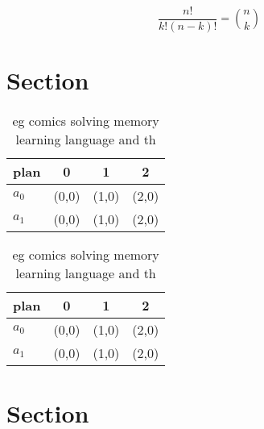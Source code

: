 \documentclass[a4paper]{article}
\begin{document}
\[ \frac{n!}{k!(n-k)!} = \binom{n}{k} \]

\section{Section}

\begin{table}
\begin{adjustbox}{width=0.6\columnwidth}
\begin{tabular}{|l|l|l|l|}
\hline
\textbf{plan} & \multicolumn{1}{c|}{\textbf{0}} & \multicolumn{1}{c|}{\textbf{1}} & \multicolumn{1}{c|}{\textbf{2}} \\ \hline
\textbf{$a_0$}  & (0,0) & (1,0) & (2,0) \\ \hline
\textbf{$a_1$}  & (0,0) & (1,0) & (2,0) \\ \hline
\end{tabular}
\end{adjustbox}
\caption{eg comics solving memory learning language and th
}
\end{table}

\begin{table}
\begin{adjustbox}{width=0.6\columnwidth}
\begin{tabular}{|l|l|l|l|}
\hline
\textbf{plan} & \multicolumn{1}{c|}{\textbf{0}} & \multicolumn{1}{c|}{\textbf{1}} & \multicolumn{1}{c|}{\textbf{2}} \\ \hline
\textbf{$a_0$}  & (0,0) & (1,0) & (2,0) \\ \hline
\textbf{$a_1$}  & (0,0) & (1,0) & (2,0) \\ \hline
\end{tabular}
\end{adjustbox}
\caption{eg comics solving memory learning language and th
}
\end{table}

\section{Section}
\end{document}
